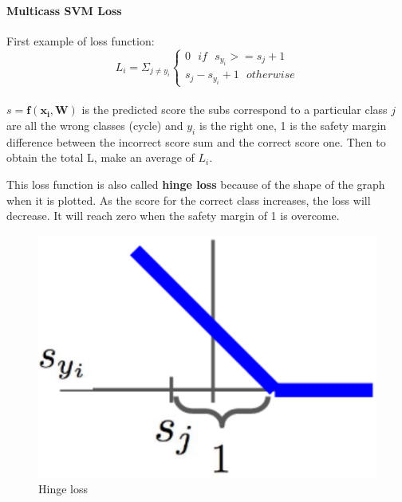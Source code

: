 \documentclass[11pt]{article}
\begin{document}
\paragraph{Multicass SVM Loss}
First example of loss function:\\
\begin{equation}{}
L_i=  \Sigma_{j \neq y_i}
\begin{cases}
 0  \ \ \ if \ \ \ s_{y_i} >= s_j + 1\\
s_j -s_{y_i} + 1 \ \ \ otherwise
\label{svm}
\end{cases}{}
\end{equation}\\
$s= \mathbf{f(x_i,W)}$ is the predicted score the subs correspond to a particular class
 $j$ are all the wrong classes (cycle) and $y_i$ is the right one, 1 is the safety margin difference between the incorrect score sum and the correct score one.
Then to obtain the total L, make an average of $L_i$.\\
\begin{minipage}{0.5\textwidth}
This loss function is also called \textbf{hinge loss} because of the shape of the graph when it is plotted.
As the score for the correct class increases, the loss will decrease. It will reach zero when the safety margin of 1 is overcome.

\end{minipage}
\begin{minipage}{0.5\textwidth}
\begin{figure} [H]
\centering 
\includegraphics[scale=0.8]{L211.pdf}
\caption{Hinge loss}
\label{fig:L211}
\end{figure}
\end{minipage}\\
\end{document}
